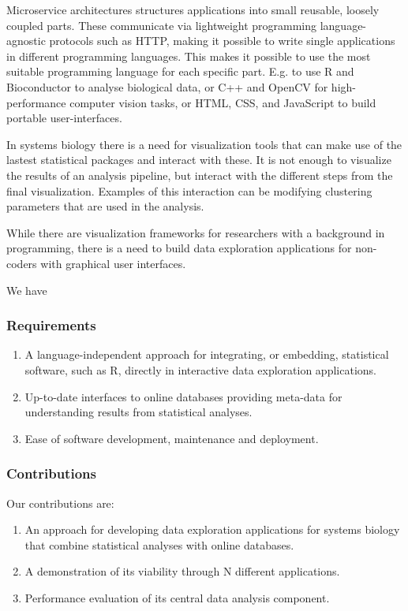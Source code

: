 
Microservice architectures structures applications into small reusable, loosely
coupled parts. These communicate via lightweight programming language-agnostic
protocols such as HTTP, making it possible to write single applications in
different programming languages. This makes it possible to use the most suitable
programming language for each specific part. E.g. to use R and Bioconductor to
analyse biological data, or C++ and OpenCV for high-performance computer vision
tasks, or HTML, CSS, and JavaScript to build portable user-interfaces. 


In systems biology there is a need for visualization tools that can make use of
the lastest statistical packages and interact with these. It is not enough to
visualize the results of an analysis pipeline, but interact with the different
steps from the final visualization. Examples of this interaction can be
modifying clustering parameters that are used in the analysis.

While there are visualization frameworks for researchers with a background in
programming, there is a need to build data exploration applications for
non-coders with graphical user interfaces.



We have 
\subsubsection*{Requirements} 
\begin{enumerate}
    \item A language-independent approach for integrating, or embedding,
        statistical software, such as R, directly in interactive data
        exploration applications.
    \item Up-to-date interfaces to online databases providing meta-data for
        understanding results from statistical analyses.
    \item Ease of software development, maintenance and deployment. 
\end{enumerate} 

\subsubsection*{Contributions} 
Our contributions are: 
\begin{enumerate}
\item An approach for developing data exploration applications for systems
biology that combine statistical analyses with online databases.  
\item A demonstration of its viability through N different applications. 
\item Performance evaluation of its central data analysis component. 
\end{enumerate} 


